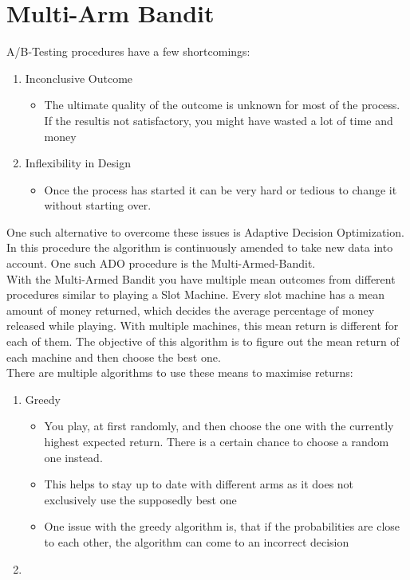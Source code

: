 \documentclass{article}
\begin{document}
	\section{Multi-Arm Bandit}
	A/B-Testing procedures have a few shortcomings:
	\begin{enumerate}
		\item{Inconclusive Outcome}
		\begin{itemize}
			\item{The ultimate quality of the outcome is unknown for most of the process. If the resultis not satisfactory, you might have wasted a lot of time and money}
		\end{itemize}
		\item{Inflexibility in Design}
		\begin{itemize}
			\item{Once the process has started it can be very hard or tedious to change it without starting over.}
		\end{itemize}
	\end{enumerate}
	One such alternative to overcome these issues is Adaptive Decision Optimization. In this procedure the algorithm is continuously amended to take new data into account. One such ADO procedure is the Multi-Armed-Bandit. \\
	With the Multi-Armed Bandit you have multiple mean outcomes from different procedures similar to playing a Slot Machine. Every slot machine has a mean amount of money returned, which decides the average percentage of money released while playing. With multiple machines, this mean return is different for each of them. The objective of this algorithm is to figure out the mean return of each machine and then choose the best one. \\
	There are multiple algorithms to use these means to maximise returns:
	\begin{enumerate}
		\item{Greedy}
		\begin{itemize}
			\item{You play, at first randomly, and then choose the one with the currently highest expected return. There is a certain chance to choose a random one instead.}
			\item{This helps to stay up to date with different arms as it does not exclusively use the supposedly best one}
			\item{One issue with the greedy algorithm is, that if the probabilities are close to each other, the algorithm can come to an incorrect decision}
		\end{itemize}
		\item{}
	\end{enumerate}























  
\end{document}
